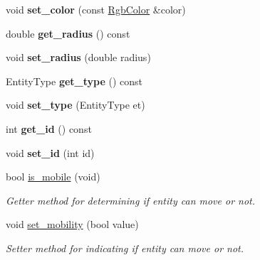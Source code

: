 \begin{DoxyCompactItemize}
\item 
void {\bfseries set\+\_\+color} (const \hyperlink{structRgbColor}{Rgb\+Color} \&color)\hypertarget{classArenaEntity_a1ac33beda7462ac5c7f4f71a70d3fb10}{}\label{classArenaEntity_a1ac33beda7462ac5c7f4f71a70d3fb10}

\item 
double {\bfseries get\+\_\+radius} () const \hypertarget{classArenaEntity_a5a2b834ad654f42785c3073c25a0fea8}{}\label{classArenaEntity_a5a2b834ad654f42785c3073c25a0fea8}

\item 
void {\bfseries set\+\_\+radius} (double radius)\hypertarget{classArenaEntity_a2b0c2512fe53d143442da5e357f71505}{}\label{classArenaEntity_a2b0c2512fe53d143442da5e357f71505}

\item 
Entity\+Type {\bfseries get\+\_\+type} () const \hypertarget{classArenaEntity_a69a818480868f9b0417e6f9ed20dfc96}{}\label{classArenaEntity_a69a818480868f9b0417e6f9ed20dfc96}

\item 
void {\bfseries set\+\_\+type} (Entity\+Type et)\hypertarget{classArenaEntity_aa65c584906d4c22f61488fab98c3392c}{}\label{classArenaEntity_aa65c584906d4c22f61488fab98c3392c}

\item 
int {\bfseries get\+\_\+id} () const \hypertarget{classArenaEntity_aee353e402d9b8a7372fae30b7a0ce4a0}{}\label{classArenaEntity_aee353e402d9b8a7372fae30b7a0ce4a0}

\item 
void {\bfseries set\+\_\+id} (int id)\hypertarget{classArenaEntity_a67f4c0467d32eec76ee6ed033ff9ed2f}{}\label{classArenaEntity_a67f4c0467d32eec76ee6ed033ff9ed2f}

\item 
bool \hyperlink{classArenaEntity_a9cfea21220c07502abd084afde49ae65}{is\+\_\+mobile} (void)\hypertarget{classArenaEntity_a9cfea21220c07502abd084afde49ae65}{}\label{classArenaEntity_a9cfea21220c07502abd084afde49ae65}

\begin{DoxyCompactList}\small\item\em Getter method for determining if entity can move or not. \end{DoxyCompactList}\item 
void \hyperlink{classArenaEntity_adb5d3089fec5c28cc989e5834fcdaf6c}{set\+\_\+mobility} (bool value)\hypertarget{classArenaEntity_adb5d3089fec5c28cc989e5834fcdaf6c}{}\label{classArenaEntity_adb5d3089fec5c28cc989e5834fcdaf6c}

\begin{DoxyCompactList}\small\item\em Setter method for indicating if entity can move or not. \end{DoxyCompactList}\end{DoxyCompactItemize}


